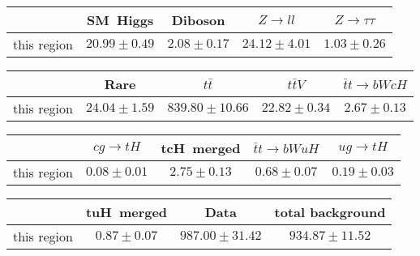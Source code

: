 \centering
\begin{tabular}{|c|c|c|c|c|} \hline
 & SM~Higgs & Diboson & $Z\to ll$ & $Z\to \tau\tau$\\\hline
this region & $20.99\pm0.49$ & $2.08\pm0.17$ & $24.12\pm4.01$ & $1.03\pm0.26$\\\hline
\end{tabular}
\begin{tabular}{|c|c|c|c|c|} \hline
 & Rare & $t\bar{t}$ & $t\bar{t}V$ & $\bar{t}t\to bWcH$\\\hline
this region & $24.04\pm1.59$ & $839.80\pm10.66$ & $22.82\pm0.34$ & $2.67\pm0.13$\\\hline
\end{tabular}
\begin{tabular}{|c|c|c|c|c|} \hline
 & $cg\to tH$ & tcH~merged & $\bar{t}t\to bWuH$ & $ug\to tH$\\\hline
this region & $0.08\pm0.01$ & $2.75\pm0.13$ & $0.68\pm0.07$ & $0.19\pm0.03$\\\hline
\end{tabular}
\begin{tabular}{|c|c|c|c|} \hline
 & tuH~merged & Data & total background\\\hline
this region & $0.87\pm0.07$ & $987.00\pm31.42$ & $934.87\pm11.52$\\\hline
\end{tabular}
